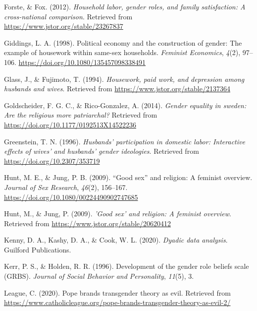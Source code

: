 \documentclass[
  man,floatsintext]{apa6}
\newlength{\cslhangindent}
\newlength{\cslentryspacingunit} %
\newenvironment{CSLReferences}[2] %
 {%
  \setlength{\parindent}{0pt}
  \ifodd #1
  \let\oldpar\par
  \def\par{\hangindent=\cslhangindent\oldpar}
  \fi
  \setlength{\parskip}{#2\cslentryspacingunit}
 }%
 {}
\begin{document}
\begin{CSLReferences}{1}{0}
\leavevmode{}%
Forste, \& Fox. (2012). \emph{Household labor, gender roles, and family satisfaction: A cross-national comparison}. Retrieved from \url{https://www.jstor.org/stable/23267837}

\leavevmode{}%
Giddings, L. A. (1998). Political economy and the construction of gender: The example of housework within same-sex households. \emph{Feminist Economics}, \emph{4}(2), 97--106. \url{https://doi.org/10.1080/135457098338491}

\leavevmode{}%
Glass, J., \& Fujimoto, T. (1994). \emph{Housework, paid work, and depression among husbands and wives}. Retrieved from \url{https://www.jstor.org/stable/2137364}

\leavevmode{}%
Goldscheider, F. G. C., \& Rico-Gonzalez, A. (2014). \emph{Gender equality in sweden: Are the religious more patriarchal?} Retrieved from \url{https://doi.org/10.1177/0192513X14522236}

\leavevmode{}%
Greenstein, T. N. (1996). \emph{Husbands' participation in domestic labor: Interactive effects of wives' and husbands' gender ideologies}. Retrieved from \url{https://doi.org/10.2307/353719}

\leavevmode{}%
Hunt, M. E., \& Jung, P. B. (2009). {``Good sex''} and religion: A feminist overview. \emph{Journal of Sex Research}, \emph{46}(2), 156--167. \url{https://doi.org/10.1080/00224490902747685}

\leavevmode{}%
Hunt, M., \& Jung, P. (2009). \emph{'Good sex' and religion: A feminist overview}. Retrieved from \url{https://www.jstor.org/stable/20620412}

\leavevmode{}%
Kenny, D. A., Kashy, D. A., \& Cook, W. L. (2020). \emph{Dyadic data analysis}. Guilford Publications.

\leavevmode{}%
Kerr, P. S., \& Holden, R. R. (1996). Development of the gender role beliefs scale (GRBS). \emph{Journal of Social Behavior and Personality}, \emph{11}(5), 3.

\leavevmode{}%
League, C. (2020). Pope brands transgender theory as evil. Retrieved from \url{https://www.catholicleague.org/pope-brands-transgender-theory-as-evil-2/}


\end{CSLReferences}
\end{document}
